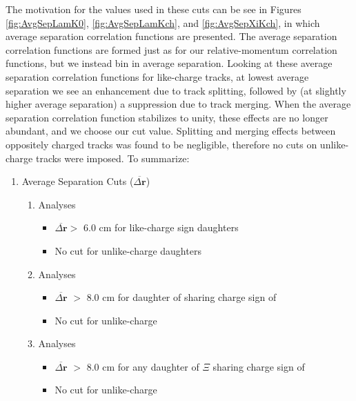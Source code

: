 \documentclass[/home/jesse/Analysis/FemtoAnalysis/AnalysisNotes/AnalysisNoteJBuxton.tex]{subfiles}
\begin{document}
The motivation for the values used in these cuts can be see in Figures \ref{fig:AvgSepLamK0}, \ref{fig:AvgSepLamKch}, and \ref{fig:AvgSepXiKch}, in which average separation correlation functions are presented.
The average separation correlation functions are formed just as for our relative-momentum correlation functions, but we instead bin in average separation.
Looking at these average separation correlation functions for like-charge tracks, at lowest average separation we see an enhancement due to track splitting, followed by (at slightly higher average separation) a suppression due to track merging.
When the average separation correlation function stabilizes to unity, these effects are no longer abundant, and we choose our cut value.
Splitting and merging effects between oppositely charged tracks was found to be negligible, therefore no cuts on unlike-charge tracks were imposed. To summarize:


\begin{enumerate}
 \item[] Average Separation Cuts ($\overline{\Delta\mathbf{r}}$)
 \begin{enumerate}
  \item \LamKs Analyses
  \begin{itemize}
   \item $\overline{\Delta\mathbf{r}} >$ 6.0 cm for like-charge sign daughters
   \item No cut for unlike-charge daughters
  \end{itemize}
  \item \LamKpm Analyses
  \begin{itemize}
   \item $\overline{\Delta\mathbf{r}}$ $>$ 8.0 cm for daughter of \LamALam sharing charge sign of \Kpm
   \item No cut for unlike-charge
  \end{itemize}
  \item \XiKpm Analyses
  \begin{itemize}
   \item $\overline{\Delta\mathbf{r}}$ $>$ 8.0 cm for any daughter of $\Xi$ sharing charge sign of \Kpm
   \item No cut for unlike-charge
  \end{itemize}  
 \end{enumerate}
\end{enumerate}
\end{document}
